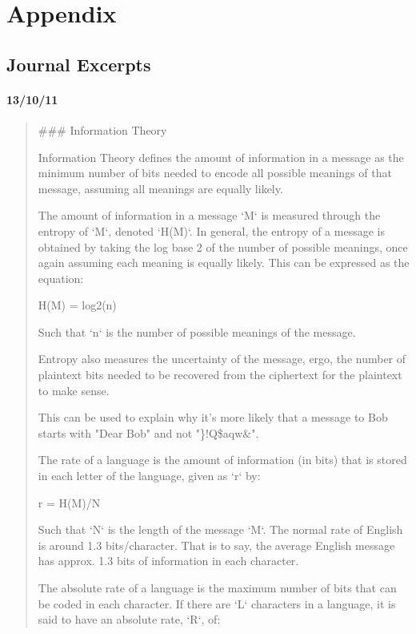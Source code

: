 \documentclass[12pt, a4paper, final]{report}
\begin{document}
\section*{Appendix}

\subsection*{Journal Excerpts}

\paragraph*{13/10/11}
\begin{quote}
\#\#\# Information Theory

Information Theory defines the amount of information in a message as the minimum number of
bits needed to encode all possible meanings of that message, assuming all meanings are equally likely.

The amount of information in a message `M` is measured through the
entropy of `M`, denoted `H(M)`. In general, the entropy of a message is obtained by taking the log base 2 of the number of possible meanings, once again assuming each meaning is equally likely. This can be expressed as the equation:

    H(M) = log2(n)

Such that `n` is the number of possible meanings of the message.

Entropy also measures the uncertainty of the message, ergo, the number of
plaintext bits needed to be recovered from the ciphertext for the plaintext to make sense.

This can be used to explain why it's more likely that a message to Bob starts
with "Dear Bob" and not "\}!Q\$aqw\&".

The rate of a language is the amount of information (in bits) that is stored in
each letter of the language, given as `r` by:

    r = H(M)/N

Such that `N` is the length of the message `M`. The normal rate of English is around
1.3 bits/character. That is to say, the average English message has approx. 1.3 bits of information in each character.

The absolute rate of a language is the maximum number of bits that can be
coded in each character. If there are `L` characters in a language, it is said to have an absolute rate, `R`, of:


\end{quote}
\end{document}
